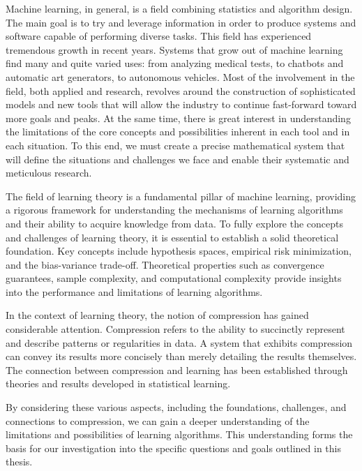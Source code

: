 Machine learning, in general, is a field combining statistics and algorithm design. 
The main goal is to try and leverage information in order to produce systems and software capable of performing diverse tasks. 
This field has experienced tremendous growth in recent years. 
Systems that grow out of machine learning find many and quite varied uses: 
from analyzing medical tests, to chatbots and automatic art generators, to autonomous vehicles. 
Most of the involvement in the field, both applied and research, revolves around the construction of sophisticated models and new tools that will allow the industry to continue fast-forward toward more goals and peaks. 
At the same time, there is great interest in understanding the limitations of the core concepts and possibilities inherent in each tool and in each situation. To this end, we must create a precise mathematical system that will define the situations and challenges we face and enable their systematic and meticulous research.

The field of learning theory is a fundamental pillar of machine learning, providing a rigorous framework for understanding the mechanisms of learning algorithms and their ability to acquire knowledge from data. 
To fully explore the concepts and challenges of learning theory, it is essential to establish a solid theoretical foundation. Key concepts include hypothesis spaces, empirical risk minimization, and the bias-variance trade-off. Theoretical properties such as convergence guarantees, sample complexity, and computational complexity provide insights into the performance and limitations of learning algorithms. 

In the context of learning theory, the notion of compression has gained considerable attention. Compression refers to the ability to succinctly represent and describe patterns or regularities in data. A system that exhibits compression can convey its results more concisely than merely detailing the results themselves. The connection between compression and learning has been established through theories and results developed in statistical learning.

By considering these various aspects, including the foundations, challenges, and connections to compression, we can gain a deeper understanding of the limitations and possibilities of learning algorithms. This understanding forms the basis for our investigation into the specific questions and goals outlined in this thesis.
